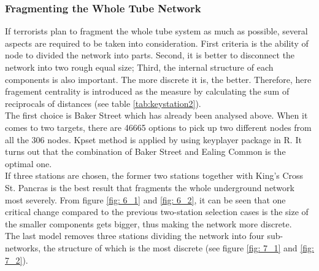 \documentclass[a4paper,reqno,]{article}
\begin{document}
\subsubsection{Fragmenting the Whole Tube Network}
If terrorists plan to fragment the whole tube system as much as possible, several aspects are required to be taken into consideration. First criteria is the ability of node to divided the network into parts. Second, it is better to disconnect the network into two rough equal size; Third, the internal structure of each components is also important. The more discrete it is, the better. Therefore, here fragement centrality is introduced as the measure by calculating the sum of reciprocals of distances (see table \ref{tab:keystation2}).
\\The first choice is Baker Street which has already been analysed above. When it comes to two targets, there are 46665 options to pick up two different nodes from all the 306 nodes. Kpset method is applied by using keyplayer package in R. It turns out that the combination of Baker Street and  Ealing Common is the optimal one. 
\\If three stations are chosen, the former two stations together with King's Cross St. Pancras is the best result that fragments the whole underground network most severely.
From figure \ref{fig: 6_1} and \ref{fig: 6_2}, it can be seen that one critical change compared to the previous two-station selection cases is the size of the smaller components gets bigger, thus making the network more discrete. 
\\The last model removes three stations dividing the network into four sub-networks, the structure of which is the most discrete (see figure \ref{fig: 7_1} and \ref{fig: 7_2}).
\end{document}
